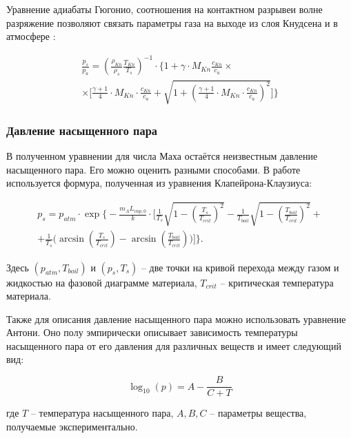 Уравнение адиабаты Гюгонио, соотношения на контактном разрывеи волне разряжение позволяют связать параметры газа на выходе из слоя Кнудсена и в атмосфере \cite{klassen2018simulation}:

\begin{multline}
\label{eq:rh}
    \frac{p_s}{p_a} = \left( \frac{\rho_{Kn}}{\rho_s} \frac{T_{Kn}}{T_s} \right)^{-1} \cdot \Bigg\{1 + \gamma \cdot M_{Kn} \frac{c_{Kn}}{c_a} \times \\ \times \Bigg[ \frac{\gamma + 1}{4} \cdot M_{Kn} \cdot \frac{c_{Kn}}{c_a} + \sqrt{1 + \left( \frac{\gamma + 1}{4} \cdot M_{Kn} \cdot \frac{c_{Kn}}{c_a} \right)^2} \Bigg] \Bigg\}
\end{multline}

\subsubsection{Давление насыщенного пара}

В полученном уравнении для числа Маха остаётся неизвестным давление насыщенного пара. Его можно оценить разными способами. В работе \cite{klassen2018simulation} используется формура, полученная из уравнения Клапейрона-Клаузиуса:

\begin{multline}
\label{eq:cc}
    p_s = p_{atm}\cdot\exp \Bigg\{ -\frac{m_A L_{vap,0}}{k} \cdot \Bigg[ \frac{1}{T_s} \sqrt{1 - \left( \frac{T_s}{T_{crit}} \right)^2} - \frac{1}{T_{boil}} \sqrt{1 - \left( \frac{T_{boil}}{T_{crit}} \right)^2} + \\ + \frac{1}{T_s} \bigg( \arcsin \left( \frac{T_s}{T_{crit}} \right) - \arcsin\left(\frac{T_{boil}}{T_{crit}} \right)\bigg) \Bigg] \Bigg\}.
\end{multline}

Здесь $(p_{atm}, T_{boil})$ и $(p_{s}, T_{s})$ -- две точки на кривой перехода между газом и жидкостью на фазовой диаграмме материала, $T_{crit}$ -- критическая температура материала.

Также для описания давление насыщенного пара можно использовать уравнение Антони. Оно полу эмпирически описывает зависимость температуры насыщенного пара от его давления для различных веществ и имеет следующий вид:

\begin{equation}
    \log_{10}(p) = A - \frac{B}{C + T}
\end{equation}

где $T$ -- температура насыщенного пара, $A, B, C$ -- параметры вещества, получаемые экспериментально.

